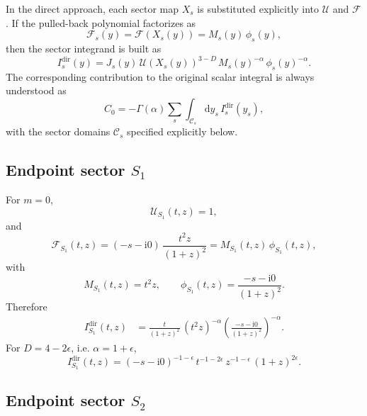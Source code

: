 \documentclass[11pt]{article}
\newcommand{\dd}{\mathrm d}
\newcommand{\ii}{\mathrm i}
\newcommand{\eps}{\epsilon}
\newcommand{\U}{\mathcal U}
\newcommand{\F}{\mathcal F}
\begin{document}
In the direct approach, each sector map \(X_s\) is substituted explicitly into
\(\U\) and \(\F\).  If the pulled-back polynomial factorizes as
\begin{equation}
  \F_s(y)
  =
  \F(X_s(y))
  =
  M_s(y)\,\phi_s(y),
\end{equation}
then the sector integrand is built as
\begin{equation}
  I_s^{\mathrm{dir}}(y)
  =
  J_s(y)\,
  \U(X_s(y))^{3-D}\,
  M_s(y)^{-\alpha}\,
  \phi_s(y)^{-\alpha}.
\end{equation}
The corresponding contribution to the original scalar integral is always
understood as
\begin{equation}
  C_0
  =
  -\Gamma(\alpha)
  \sum_s
  \int_{\mathcal C_s}\dd y_s\,
  I_s^{\mathrm{dir}}(y_s),
\end{equation}
with the sector domains \(\mathcal C_s\) specified explicitly below.

\subsection{\texorpdfstring{Endpoint sector \(S_1\)}{Endpoint sector S1}}

For \(m=0\),
\begin{equation}
  \U_{S_1}(t,z)=1,
\end{equation}
and
\begin{equation}
  \F_{S_1}(t,z)
  =
  (-s-\ii0)\,\frac{t^2z}{(1+z)^2}
  =
  M_{S_1}(t,z)\,\phi_{S_1}(t,z),
\end{equation}
with
\begin{equation}
  M_{S_1}(t,z)=t^2z,
  \qquad
  \phi_{S_1}(t,z)=\frac{-s-\ii0}{(1+z)^2}.
\end{equation}
Therefore
\begin{align}
  I_{S_1}^{\mathrm{dir}}(t,z)
  &=
  \frac{t}{(1+z)^2}\,
  (t^2z)^{-\alpha}
  \left(\frac{-s-\ii0}{(1+z)^2}\right)^{-\alpha}.
\end{align}
For \(D=4-2\eps\), i.e. \(\alpha=1+\eps\),
\begin{equation}
  I_{S_1}^{\mathrm{dir}}(t,z)
  =
  (-s-\ii0)^{-1-\eps}\,
  t^{-1-2\eps}\,
  z^{-1-\eps}\,
  (1+z)^{2\eps}.
\end{equation}

\subsection{\texorpdfstring{Endpoint sector \(S_2\)}{Endpoint sector S2}}
\end{document}
